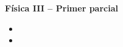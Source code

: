 \documentclass[addpoints]{exam}
\begin{document}
\renewcommand{\tablename}{Tabla}


\begin{tcolorbox}[colback=white,arc=0mm,colframe=black]
    \begin{center}
        \Large\textbf{Física III -- Primer parcial}
    \end{center}
\end{tcolorbox}

\begin{itemize}
    \item {}
    \item {}
\end{itemize}
\end{document}
